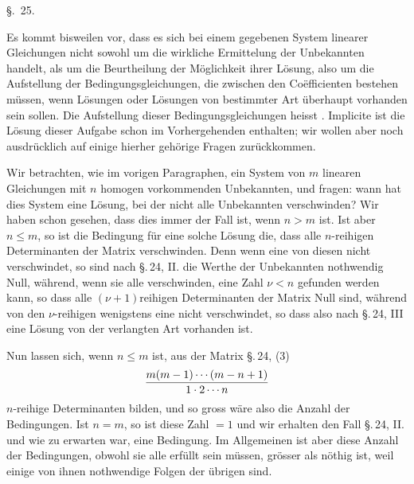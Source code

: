 
\begin{center}
{\large \S.\ 25.}

\vspace{0.5em}
{\large{}}
\end{center}

Es kommt bisweilen vor, dass es sich bei einem gegebenen System linearer Gleichungen nicht sowohl um die wirkliche Ermittelung der Unbekannten handelt, als um die Beurtheilung der Möglichkeit ihrer Lösung, also um die Aufstellung der Bedingungsgleichungen, die zwischen den Coëfficienten bestehen müssen, wenn Lösungen oder Lösungen von bestimmter Art überhaupt vorhanden sein sollen. Die Aufstellung dieser Bedingungsgleichungen heisst . Implicite ist die Lösung dieser Aufgabe schon im Vorhergehenden enthalten; wir wollen aber noch ausdrücklich auf einige hierher gehörige Fragen zurückkommen.

Wir betrachten, wie im vorigen Paragraphen, ein System von $m$ linearen Gleichungen mit $n$ homogen vorkommenden Unbekannten, und fragen: wann hat dies System eine Lösung, bei der nicht alle Unbekannten verschwinden? Wir haben schon gesehen, dass dies immer der Fall ist, wenn $n>m$ ist. Ist aber $n\le m$, so ist die  Bedingung für eine solche Lösung die, dass alle $n$-reihigen Determinanten der Matrix verschwinden. Denn wenn eine von diesen nicht verschwindet, so sind nach \S.\,24, II. die Werthe der Unbekannten nothwendig Null, während, wenn sie alle verschwinden, eine Zahl $\nu<n$ gefunden werden kann, so dass alle $(\nu+1)$reihigen Determinanten der Matrix Null sind, während von den $\nu$-reihigen wenigstens eine nicht verschwindet, so dass also nach \S.\,24, III eine Lösung von der verlangten Art vorhanden ist.

Nun lassen sich, wenn $n\le m$ ist, aus der Matrix \S.\,24, (3)
\[
 {m(m-1)\cdots(m-n+1)\over 1\cdot2\cdots n}
\]
$n$-reihige Determinanten bilden, und so gross wäre also die Anzahl der Bedingungen. Ist $n=m$, so ist diese Zahl $=1$ und wir erhalten den Fall \S.\,24, II. und wie zu erwarten war, eine Bedingung. Im Allgemeinen ist aber diese Anzahl der Bedingungen, obwohl sie alle erfüllt sein müssen, grösser als nöthig ist, weil einige von ihnen nothwendige Folgen der übrigen sind.
